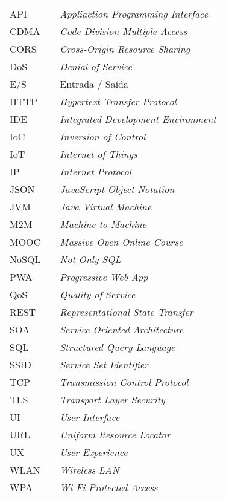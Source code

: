 \begin{table}[H]
\centering
\label{my-label}
\begin{tabular}{lll}
API   &  & \textit{Appliaction Programming Interface}                \\
CDMA  &  & \textit{Code Division Multiple Access}                    \\
CORS  &  & \textit{Cross-Origin Resource Sharing}                    \\
DoS   &  & \textit{Denial of Service}                                \\
E/S   &  & Entrada / Saída                                           \\
HTTP  &  & \textit{Hypertext Transfer Protocol}                      \\
IDE   &  & \textit{Integrated Development Environment}               \\
IoC   &  & \textit{Inversion of Control}                             \\
IoT   &  & \textit{Internet of Things}                               \\
IP    &  & \textit{Internet Protocol}                                \\
JSON  &  & \textit{JavaScript Object Notation}                       \\
JVM   &  & \textit{Java Virtual Machine}                             \\
M2M   &  & \textit{Machine to Machine}                               \\
MOOC  &  & \textit{Massive Open Online Course}                       \\
NoSQL &  & \textit{Not Only SQL}                                     \\
PWA   &  & \textit{Progressive Web App}                              \\
QoS   &  & \textit{Quality of Service}                               \\
REST  &  & \textit{Representational State Transfer}                  \\
SOA   &  & \textit{Service-Oriented Architecture}                    \\
SQL   &  & \textit{Structured Query Language}                        \\
SSID  &  & \textit{Service Set Identifier}                           \\
TCP   &  & \textit{Transmission Control Protocol}                    \\
TLS   &  & \textit{Transport Layer Security}                         \\
UI    &  & \textit{User Interface}                                   \\
URL   &  & \textit{Uniform Resource Locator}                         \\
UX    &  & \textit{User Experience}                                  \\
WLAN  &  & \textit{Wireless LAN}                                     \\
WPA   &  & \textit{Wi-Fi Protected Access}
\end{tabular}
\end{table}
